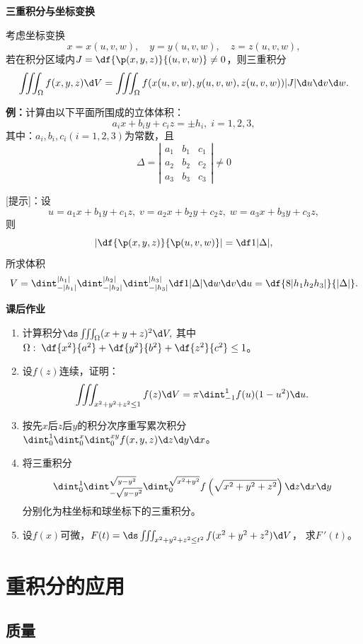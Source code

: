 \begin{shaded}
	{\bf 三重积分与坐标变换}
	\begin{tcolorbox}
		考虑坐标变换
		$$x=x(u,v,w),\quad y=y(u,v,w),\quad z=z(u,v,w),$$
		若在积分区域内$J=\df{\p(x,y,z)}{(u,v,w)}\ne 0$，则三重积分
		$$\iiint_{\Omega}f(x,y,z)\d V
		=\iiint_{\Omega}f(x(u,v,w),y(u,v,w),z(u,v,w))|J|\d u\d v\d w.$$
	\end{tcolorbox}
	
	{\bf 例：}计算由以下平面所围成的立体体积：
	$$a_ix+b_iy+c_iz=\pm h_i,\;i=1,2,3,$$
	其中：$a_i,b_i,c_i(i=1,2,3)$为常数，且
	$$\Delta=\left|\begin{array}{ccc}
	a_1 & b_1 & c_1\\ a_2 & b_2 & c_2 \\ a_3 & b_3 & c_3
	\end{array}\right|\ne 0$$
	
	[提示]：设
	$$u=a_1x+b_1y+c_1z,\;v=a_2x+b_2y+c_2z,\;w=a_3x+b_3y+c_3z,$$
	则
	$$\left|\df{\p(x,y,z)}{\p(u,v,w)}\right|=\df1{|\Delta|},$$
	所求体积
	$$V=\dint_{-|h_1|}^{|h_1|}\dint_{-|h_2|}^{|h_2|}\dint_{-|h_3|}^{|h_3|}
	\df1{|\Delta|}\d w\d v\d u=\df{8|h_1h_2h_3|}{|\Delta|}.$$
\end{shaded}

\begin{ext}
	{\bf 课后作业}
	\begin{enumerate}
	  \item 计算积分$\ds\iiint_{\Omega}(x+y+z)^2\d V,$
	  其中$\Omega:\;\df{x^2}{a^2}+\df{y^2}{b^2}+\df{z^2}{c^2}\leq 1$。
	  \item 设$f(z)$连续，证明：
	  $$\iiint_{x^2+y^2+z^2\leq 1}f(z)\d V=\pi\dint_{-1}^1f(u)(1-u^2)\d u.$$
	  \item 按先$x$后$z$后$y$的积分次序重写累次积分
	  $\dint_0^1\dint_0^x\dint_0^{xy}f(x,y,z)\d z\d y\d x$。
	  \item 将三重积分
		$$\dint_0^1\dint_{-\sqrt{y-y^2}}^{\sqrt{y-y^2}}
		\dint_0^{\sqrt{x^2+y^2}}f\left(
		\sqrt{x^2+y^2+z^2}\right)\d z\d x\d y$$
		分别化为柱坐标和球坐标下的三重积分。
	  \item 设$f(x)$可微，$F(t)=\ds\iiint_{x^2+y^2+z^2\leq t^2}f(x^2+y^2+z^2)\d V$，
	  求$F\,'(t)$。
	\end{enumerate}
\end{ext}

\section{重积分的应用}

\subsection{质量}

